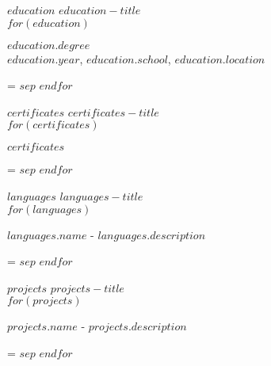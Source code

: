 \documentclass[11pt,a4paper]{article}
\newcommand{\spaceXL} {\vspace{20pt}}
\newcommand{\spaceM} {\vspace{8pt}}
\newcommand{\spaceS} {\vspace{4pt}}
\newcommand{\sectionTitle}[1]{\textcolor{secondaryColor}{\uppercase{\small{#1}}}}
\newcommand{\contentTitle}[1] {\MakeUppercase\normalsize\textbf{#1}}
\newcommand{\contentSubTitle}[1] {\normalsize\textcolor{secondaryColor}{#1}}
\newcommand{\content}[1] {\normalsize{#1}}
\newenvironment{absolutelynopagebreak}
  {\par\nobreak\vfil\penalty0\vfilneg
   \vtop\bgroup}
  {\par\xdef\tpd{\the\prevdepth}\egroup
   \prevdepth=\tpd}
\def \ifNotEmpty#1{\def\temp{#1} \ifx\temp\empty \else}
\begin{document}
\ifNotEmpty{$education$}
  \spaceXL
  \sectionTitle{$education-title$} \\

  \spaceM
  $for(education)$
    \begin{absolutelynopagebreak}
      \contentTitle{$education.degree$} \\
      \contentSubTitle{$education.year$, $education.school$, $education.location$} \\
    \end{absolutelynopagebreak}
    $sep$\spaceS
  $endfor$
\fi

\ifNotEmpty{$certificates$}
  \spaceXL
  \sectionTitle{$certificates-title$} \\

  \spaceM
  $for(certificates)$
    \begin{absolutelynopagebreak}
      \contentTitle{$certificates$} \\
    \end{absolutelynopagebreak}
    $sep$\spaceS
  $endfor$
\fi

\ifNotEmpty{$languages$}
  \spaceXL
  \sectionTitle{$languages-title$} \\

  \spaceM
  $for(languages)$
    \begin{absolutelynopagebreak}
      \contentTitle{$languages.name$} - \content{$languages.description$} \\
    \end{absolutelynopagebreak}
    $sep$\spaceS
  $endfor$
\fi

\ifNotEmpty{$projects$}
  \spaceXL
  \sectionTitle{$projects-title$} \\

  \spaceM
  $for(projects)$
    \begin{absolutelynopagebreak}
      \contentTitle{$projects.name$} - \content{$projects.description$} \\
    \end{absolutelynopagebreak}
    $sep$\spaceS
  $endfor$
\fi
\end{document}
